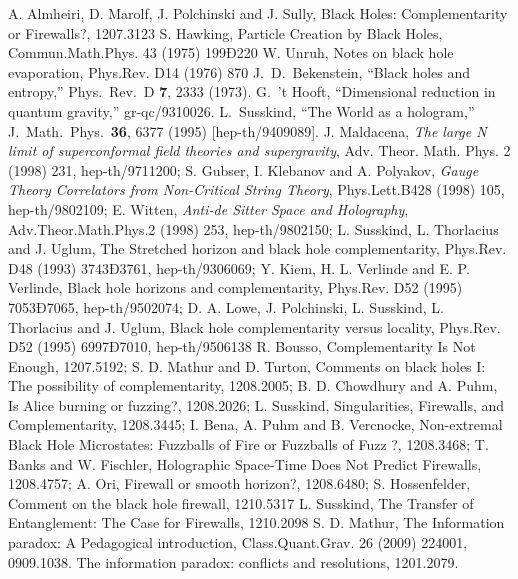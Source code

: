 \documentclass[12pt]{article}%
\begin{document}
\begin{thebibliography}{99}

A. Almheiri, D. Marolf, J. Polchinski and J. Sully, Black Holes: Complementarity or Firewalls?, 1207.3123 
 S. Hawking, Particle Creation by Black Holes, Commun.Math.Phys. 43 (1975) 199Ð220
 W. Unruh, Notes on black hole evaporation, Phys.Rev. D14 (1976) 870
    J.~D.~Bekenstein, ``Black holes and entropy,'' Phys.\ Rev.\ D {\bf 7}, 2333 (1973).
  G.~'t Hooft,  ``Dimensional reduction in quantum gravity,'' gr-qc/9310026.
   L.~Susskind,  ``The World as a hologram,'' J.\ Math.\ Phys.\  {\bf 36}, 6377 (1995) [hep-th/9409089].
 J. Maldacena,  {\it  The large N limit of superconformal field theories and supergravity}, Adv. Theor. Math. Phys. 2 (1998) 231,
hep-th/9711200; S. Gubser, I. Klebanov and A. Polyakov,  {\it Gauge Theory Correlators from Non-Critical String Theory},
 Phys.Lett.B428 (1998) 105, 
hep-th/9802109; E. Witten, {\it Anti-de Sitter Space and Holography},
Adv.Theor.Math.Phys.2 (1998) 253, hep-th/9802150;
  L. Susskind, L. Thorlacius and J. Uglum, The Stretched horizon and black hole complementarity, Phys.Rev. D48 (1993) 3743Ð3761, hep-th/9306069;
 Y. Kiem, H. L. Verlinde and E. P. Verlinde, Black hole horizons and complementarity, Phys.Rev. D52 (1995) 7053Ð7065, hep-th/9502074;
D. A. Lowe, J. Polchinski, L. Susskind, L. Thorlacius and J. Uglum, Black hole complementarity versus locality, Phys.Rev. D52 (1995) 6997Ð7010, hep-th/9506138 
R. Bousso, Complementarity Is Not Enough, 1207.5192;
S. D. Mathur and D. Turton, Comments on black holes I: The possibility of complementarity, 1208.2005;
B. D. Chowdhury and A. Puhm, Is Alice burning or fuzzing?, 1208.2026;  L. Susskind, Singularities, Firewalls, and Complementarity, 1208.3445;
 I. Bena, A. Puhm and B. Vercnocke, Non-extremal Black Hole Microstates: Fuzzballs of Fire or Fuzzballs of Fuzz ?, 1208.3468;
 T. Banks and W. Fischler, Holographic Space-Time Does Not Predict Firewalls, 1208.4757;
 A. Ori, Firewall or smooth horizon?, 1208.6480;   S. Hossenfelder, Comment on the black hole firewall, 1210.5317
 L. Susskind, The Transfer of Entanglement: The Case for Firewalls, 1210.2098
   S. D. Mathur, The Information paradox: A Pedagogical introduction, Class.Quant.Grav. 26 (2009) 224001, 0909.1038.
The information paradox: conflicts and resolutions, 1201.2079.

\end{thebibliography}
\end{document}
